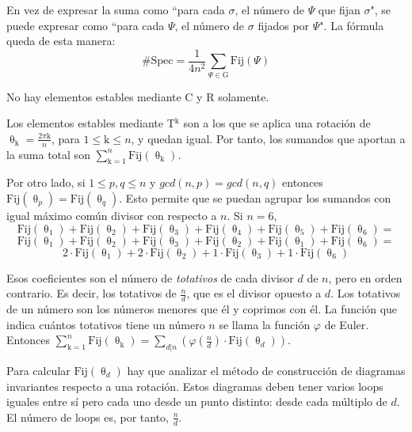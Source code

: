 		En vez de expresar la suma como ``para cada $\sigma$, el número de $\Psi$ que fijan $\sigma$", se puede expresar como ``para cada $\Psi$, el número de $\sigma$ fijados por $\Psi$". La fórmula queda de esta manera:
		$$\#\text{Spec}=\frac{1}{4n^2}\sum_{\Psi\in\text{G}}\text{Fij}(\Psi)$$
		
		No hay elementos estables mediante C y R solamente.
		
		Los elementos estables mediante T$^\text{k}$ son a los que se aplica una rotación de $\uptheta_\text{k}=\frac{2\pi\text{k}}{n}$, para $1\leq\text{k}\leq n$, y quedan igual. Por tanto, los sumandos que aportan a la suma total son $\sum_{\text{k}=1}^{n}\text{Fij}(\uptheta_\text{k})$.
		
		Por otro lado, si $1\leq p,q\leq n$ y $gcd(n,p)=gcd(n,q)$ entonces $\text{Fij}(\uptheta_p)=\text{Fij}(\uptheta_q)$. Esto permite que se puedan agrupar los sumandos con igual máximo común divisor con respecto a $n$. Si $n=6$, $$\text{Fij}(\uptheta_\text{1})+\text{Fij}(\uptheta_\text{2})+\text{Fij}(\uptheta_\text{3})+\text{Fij}(\uptheta_\text{4})+\text{Fij}(\uptheta_\text{5})+\text{Fij}(\uptheta_\text{6})=$$
		$$\text{Fij}(\uptheta_\text{1})+\text{Fij}(\uptheta_\text{2})+\text{Fij}(\uptheta_\text{3})+\text{Fij}(\uptheta_\text{2})+\text{Fij}(\uptheta_\text{1})+\text{Fij}(\uptheta_\text{6})=$$
		$$2\cdot\text{Fij}(\uptheta_\text{1})+2\cdot\text{Fij}(\uptheta_\text{2})+1\cdot\text{Fij}(\uptheta_\text{3})+1\cdot\text{Fij}(\uptheta_\text{6})$$
		
		Esos coeficientes son el número de \textit{totativos} de cada divisor $d$ de $n$, pero en orden contrario. Es decir, los totativos de $\frac{n}{d}$, que es el divisor opuesto a $d$. Los totativos de un número son los números menores que él y coprimos con él. La función que indica cuántos totativos tiene un número $n$ se llama la función $\varphi$ de Euler. Entonces $\sum_{\text{k}=1}^{n}\text{Fij}(\uptheta_\text{k})=\sum_{d|n}\left(\varphi(\frac{n}{d})\cdot\text{Fij}(\uptheta_d)\right)$.
		
		Para calcular $\text{Fij}(\uptheta_d)$ hay que analizar el método de construcción de diagramas invariantes respecto a una rotación. Estos diagramas deben tener varios loops iguales entre sí pero cada uno desde un punto distinto: desde cada múltiplo de $d$. El número de loops es, por tanto, $\frac{n}{d}$.
		

